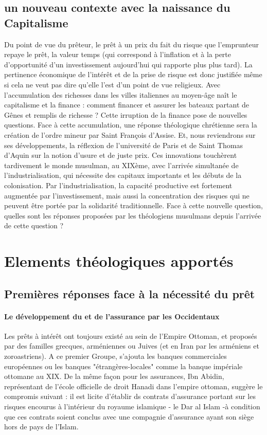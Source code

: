 \subsection{un nouveau contexte avec la naissance du Capitalisme}
Du point de vue du prêteur, le prêt à un prix du fait du risque  que l'emprunteur repaye le prêt, la valeur temps (qui correspond à l'inflation et à la perte d'opportunité d'un investissement aujourd'hui qui rapporte plus plus tard). La pertinence économique de l'intérêt et de la prise de risque est donc justifiée même si cela ne veut pas dire qu'elle l'est d'un point de vue religieux.
Avec l'accumulation des richesses dans les villes italiennes au moyen-âge naît le capitalisme et la finance : comment financer et assurer les bateaux partant de Gênes et remplis de richesse ? Cette irruption de la finance pose de nouvelles questions.  Face à cette accumulation, une réponse théologique chrétienne sera la création de l'ordre mineur par Saint François d'Assise. Et, nous reviendrons sur ses développements, la réflexion de l'université de Paris et de Saint Thomas d'Aquin sur la notion d'usure et de juste prix.  
Ces innovations touchèrent tardivement le monde musulman, au XIXème, avec l'arrivée simultanée de l'industrialisation, qui nécessite des capitaux importants et les débuts de la colonisation. Par l'industrialisation, la capacité productive est fortement augmentée par l'investissement, mais aussi la concentration des risques qui ne peuvent être portée par la solidarité traditionnelle.
Face à cette nouvelle question, quelles sont les réponses proposées par les théologiens musulmans depuis l'arrivée de cette question ?


\section{Elements théologiques apportés}

\subsection{Premières réponses face à la nécessité du prêt}
\paragraph{Le développement du \riba et de l'assurance par les Occidentaux} Les prêts à intérêt ont toujours existé au sein de l'Empire Ottoman\cite{Gilbar:Qadi}, et proposés par des familles grecques, arméniennes ou Juives (et en Iran par les arméniens et zoroastriens). A ce premier Groupe, s'ajouta les banques commerciales européennes ou les banques "étrangères-locales" comme la banque impériale ottomane au XIX.
De la même façon pour les assurances, Ibn Abidin, représentant de l'école officielle de droit Hanadi dans l'empire ottoman, suggère le compromis suivant : il est licite d'établir ds contrats d'assurance portant sur les risques encourus à l'intérieur du royaume islamique - le Dar al Islam -à condition que ces contrats soient conclus avec une compagnie d'assurance ayant son siège hors de pays de l'Islam. 

